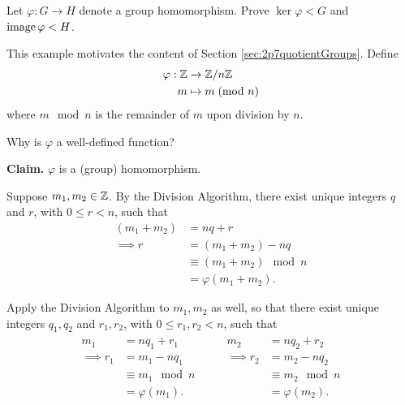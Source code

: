 \documentclass[../algebraNotesMSRI-UP2016.tex]{subfiles}
\begin{document}
\begin{frame}[c]
\begin{exe}[cf. Problem 65]\label{exe:prob65}
Let $\varphi:G\to H$ denote a group homomorphism.  Prove $\ker{\varphi}< G$ and $\operatorname{image}{\varphi}< H$.
\end{exe}
\end{frame}

\begin{frame}
\begin{ex}\label{ex:ZmodnZ}
This example motivates the content of Section \ref{sec:2p7quotientGroups}.  Define
\begin{align*}
\varphi:\mathbb Z &\to \mathbb Z/n\mathbb Z \\
m &\mapsto m\;(\text{mod } n)
\end{align*}
where $m\mod n$ is the remainder of $m$ upon division by $n$.
\end{ex}
\begin{que}
Why is $\varphi$ a well-defined function?
\end{que}

\smallGap
\textbf{Claim.} $\varphi$ is a (group) homomorphism.
\end{frame}

\begin{frame}
\pf  
Suppose $m_1,m_2\in\mathbb Z$.  By the Division Algorithm, there exist unique integers $q$ and $r$, with $0\leq r<n$, such that 
\begin{align*}
(m_1+m_2) &= nq+r \\
\implies r&= (m_1+m_2) -nq \\
	&\equiv (m_1+m_2) \mod n \\
	&= \varphi(m_1+m_2).
\end{align*}

\smallGap
Apply the Division Algorithm to $m_1,m_2$ as well, so that there exist unique integers $q_1,q_2$ and $r_1,r_2$, with $0\leq r_1,r_2<n$, such that 
\[
\begin{array}{cc}
{
	\begin{aligned}
	m_1 &= nq_1+r_1 \\
	\implies r_1&= m_1 -nq_1 \\
	&\equiv m_1\mod n \\
	&= \varphi(m_1).
\end{aligned}
}
\qquad 
{
	\begin{aligned}
	m_2 &= nq_2+r_2 \\
	\implies r_2&= m_2 -nq_2 \\
	&\equiv m_2 \mod n \\
	&= \varphi(m_2).
\end{aligned}
}
\end{array}
\]
\end{frame}
\end{document}
